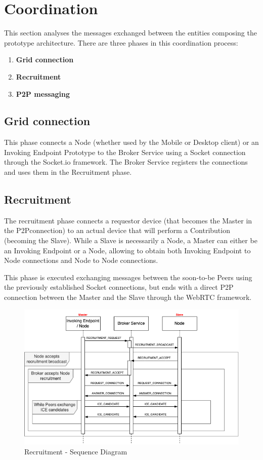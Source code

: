 \section{Coordination}\label{coordination}
This section analyses the messages exchanged between the entities composing the prototype architecture. There are three phases in this coordination process:
\begin{enumerate}
    \item \textbf{Grid connection}
    \item \textbf{Recruitment}
    \item \textbf{P2P messaging}
\end{enumerate}

\subsection{Grid connection}
This phase connects a Node (whether used by the Mobile or Desktop client) or an Invoking Endpoint Prototype to the Broker Service using a Socket connection through the Socket.io framework. The Broker Service registers the connections and uses them in the Recruitment phase.

\subsection{Recruitment}
The recruitment phase connects a requestor device (that becomes the Master in the P2Pconnection) to an actual device that will perform a Contribution (becoming the Slave). While a Slave is necessarily a Node, a Master can either be an Invoking Endpoint or a Node, allowing to obtain both Invoking Endpoint to Node connections and Node to Node connections.

This phase is executed exchanging messages between the soon-to-be Peers using the previously established Socket connections, but ends with a direct P2P connection between the Master and the Slave through the WebRTC framework.

\vspace{4mm}

\begin{figure}[!ht]
    \centering
    \includegraphics[width=\linewidth]{document/chapters/chapter_7/images/recruitment_messages.png}
    \caption{Recruitment - Sequence Diagram}
    \label{fig:recruitment_messages}
\end{figure}

